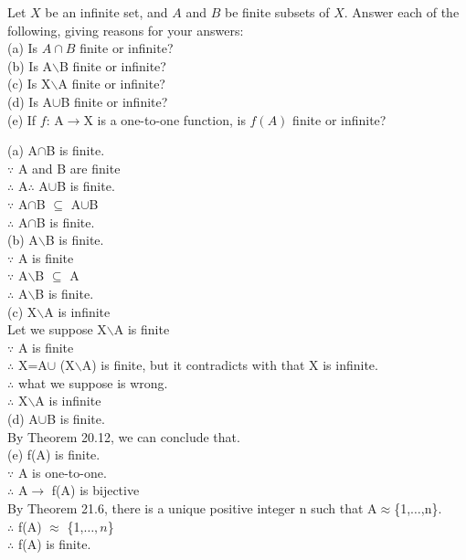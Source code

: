 \documentclass[11pt, a4paper, UTF8]{ctexart}
\begin{document}
\begin{problem}[UD:21.11]
Let $X$ be an infinite set, and $A$ and $B$ be finite subsets of $X$. Answer each of the following, giving reasons for your answers:\\
(a) Is $A\cap B$ finite or infinite?\\
(b) Is A$\backslash$B finite or infinite?\\
(c) Is X$\backslash$A finite or infinite?\\
(d) Is A$\cup$B finite or infinite?\\
(e) If $f$: A$\rightarrow$X is a one-to-one function, is $f(A)$ finite or infinite?
\end{problem}
\begin{solution}
(a) A$\cap$B is finite.\\
$\because$ A and B are finite\\
$\therefore$ A$\therefore$ A$\cup$B is finite.\\
$\because$ A$\cap$B $\subseteq$ A$\cup$B\\
$\therefore$ A$\cap$B is finite.\\
(b) A$\backslash$B is finite.\\
$\because$ A is finite\\
$\because$ A$\backslash$B $\subseteq$ A\\
$\therefore$ A$\backslash$B is finite.\\
(c) X$\backslash$A is infinite\\
Let we suppose  X$\backslash$A is finite\\
$\because$ A is finite\\
$\therefore$ X=A$\cup$ (X$\backslash$A) is finite, but it contradicts with that X is infinite.\\
$\therefore$ what we suppose is wrong.\\
$\therefore$ X$\backslash$A is infinite\\
(d) A$\cup$B is finite.\\
By Theorem 20.12, we can conclude that.\\
(e) f(A) is finite.\\
$\because$ A is one-to-one.\\
$\therefore$ A$\rightarrow$ f(A) is bijective\\
By Theorem 21.6, there is a unique positive integer n such that A$\approx$\{1,$\dots$,n\}.\\
$\therefore$ f(A) $\approx$ \{1,$\dots,n$\}\\
$\therefore$ f(A) is finite. 
\end{solution}
\end{document}
